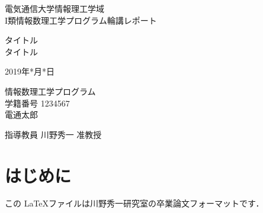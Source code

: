 \documentclass[uplatex, 12pt, dvipdfmx]{ujarticle}
\begin{document}
\thispagestyle{empty}
\vfill
\hfill 電気通信大学情報理工学域 \\
\hfill I類情報数理工学プログラム輪講レポート %
\vfill
\begin{center}
  \Large タイトル\\\vspace{3mm}タイトル
\end{center}
\vfill
\begin{center}
  2019年*月*日
\end{center}
\vfill
\begin{center}
  \large
  情報数理工学プログラム\\[1cm]
  学籍番号 1234567\\[1cm]
  電通太郎
\end{center}

\begin{center}
  指導教員 川野秀一 准教授
\end{center}
\vfill
\newpage


\tableofcontents
\newpage


\section{はじめに}
この \LaTeX ファイルは川野秀一研究室の卒業論文フォーマットです．
\end{document}
